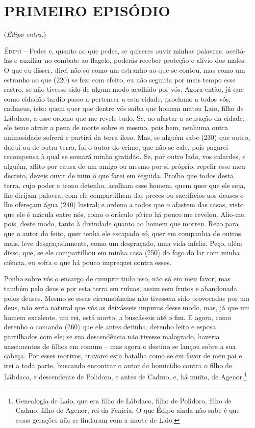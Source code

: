 \section{PRIMEIRO EPISÓDIO}

(\emph{Édipo entra.})

\textsc{Édipo} --   Pedes e, quanto ao que pedes, se quiseres ouvir minhas palavras,
aceitá-las e auxiliar no combate ao flagelo, poderás receber proteção e
alívio dos males. O que eu disser, direi não só como um estranho ao que
se contou, mas como um estranho ao que (220) se fez; com efeito, eu não
seguiria por mais tempo esse rastro, se não tivesse sido de algum modo
acolhido por vós. Agora então, já que como cidadão tardio passo a
pertencer a esta cidade, proclamo a todos vós, cadmeus, isto: quem quer
que dentre vós saiba que homem matou Laio, filho de Lábdaco, a esse
ordeno que me revele tudo. Se, ao afastar a acusação da cidade, ele teme
atrair a pena de morte sobre si mesmo, pois bem, nenhuma outra
animosidade sofrerá e partirá da terra ileso. Mas, se alguém sabe (230)
que outro, daqui ou de outra terra, foi o autor do crime, que não se
cale, pois pagarei recompensa à qual se somará minha gratidão. Se, por
outro lado, vos calardes, e alguém, aflito por causa de um amigo ou
mesmo por si próprio, repelir esse meu decreto, deveis ouvir de mim o
que farei em seguida. Proíbo que todos desta terra, cujo poder e trono
detenho, acolham esse homem, quem quer que ele seja, lhe dirijam
palavra, com ele compartilhem das preces ou sacrifícios aos deuses e lhe
ofereçam água (240) lustral; e ordeno a todos que o afastem das casas,
visto que ele é mácula entre nós, como o oráculo pítico há pouco me
revelou. Alio-me, pois, deste modo, tanto à divindade quanto ao homem
que morreu. Rezo para que o autor do feito, quer tenha ele escapado só,
quer em companhia de outros mais, leve desgraçadamente, como um
desgraçado, uma vida infeliz. Peço, além disso, que, se ele compartilhou
em minha casa (250) do fogo do lar com minha ciência, eu sofra o que há
pouco imprequei contra esses.

Ponho sobre vós o encargo de cumprir tudo isso, não só em meu favor, mas
também pelo deus e por esta terra em ruínas, assim sem frutos e
abandonada pelos deuses. Mesmo se essas circunstâncias não tivessem sido
provocadas por um deus, não seria natural que vós as deixásseis impuras
desse modo, mas, já que um homem excelente, um rei, está morto, a
buscásseis até o fim. E agora, como detenho o comando (260) que ele
antes detinha, detenho leito e esposa partilhados com ele; se sua
descendência não tivesse malogrado, haveria nascimentos de filhos em
comum -- mas agora o destino se lançou sobre a sua cabeça. Por esses
motivos, travarei esta batalha como se em favor de meu pai e irei a toda
parte, buscando encontrar o autor do homicídio contra o filho de
Lábdaco, e descendente de Polidoro, e antes de Cadmo, e, há muito, de
Agenor.\footnote{Genealogia de Laio, que era filho de Lábdaco, filho de
  Polidoro, filho de Cadmo, filho de Agenor, rei da Fenícia. O que Édipo
  ainda não sabe é que essas gerações não se findaram com a morte de
  Laio.}


